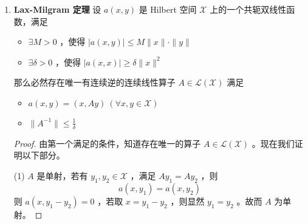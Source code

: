 \begin{enumerate}[leftmargin=2cm, label=\arabic*]
\begin{proof}
    充分性：假定 $\|A_n\|\leqslant C$ ，对 $\forall x\in\mathscr{X}$ 以及 $\forall \varepsilon > 0$ ，取 $y\in M$ 使得 
\begin{equation*}
    \|x-y\| \leqslant \eqnmarkbox[blue]{a}{\frac{\varepsilon}{4(\|A\| + C)}}
\end{equation*}

便有
\begin{equation*}
    \|A_n x - A x\| \leqslant \eqnmarkbox[red]{a1}{\|A_n x - A_n y\|} + \|A_n y - A y \| + \eqnmarkbox[red]{a2}{\|Ax - Ay\|} < \frac{\varepsilon}{2} + \|A_n y - A y\|
\end{equation*}

再取 $N$ 足够大，使得 $\|A_n y - Ay\|<\frac{\varepsilon}{2}$ ，即证。
\end{proof}
    \item  \textbf{Lax-Milgram 定理} 设 $a(x,y)$ 是 Hilbert 空间 $\mathscr{X}$ 上的一个共轭双线性函数，满足
\begin{itemize}
    \item $\exists M>0$ ，使得 $|a(x,y)|\leqslant M\|x\|\cdot\|y\|$ 
    \item $\exists \delta > 0$ ，使得 $|a(x,x)|\geqslant \delta\|x\|^2$ 
\end{itemize}
那么必然存在唯一有连续逆的连续线性算子 $A\in\mathscr{L}(\mathscr{X})$ 满足
\begin{itemize}
    \item $a(x,y) = (x, Ay)\ (\forall x,y\in\mathscr{X})$ 
    \item $\|A^{-1}\| \leqslant \frac{1}{\delta}$ 
\end{itemize}
\begin{proof}
    由第一个满足的条件，知道存在唯一的算子 $A\in\mathscr{L}(\mathscr{X})$ 。现在我们证明以下部分。

(1) $A$ 是单射，若有 $y_1, y_2\in\mathscr{X}$ ，满足 $Ay_1 = Ay_2$ ，则
\begin{equation*}
    a(x,y_1) = a(x,y_2)
\end{equation*}
则 $a(x, y_1 - y_2) = 0$ ，若取 $x = y_1 - y_2$ ，则显然 $y_1 = y_2$ 。故而 $A$ 为单射。


\end{proof}
\end{enumerate}
